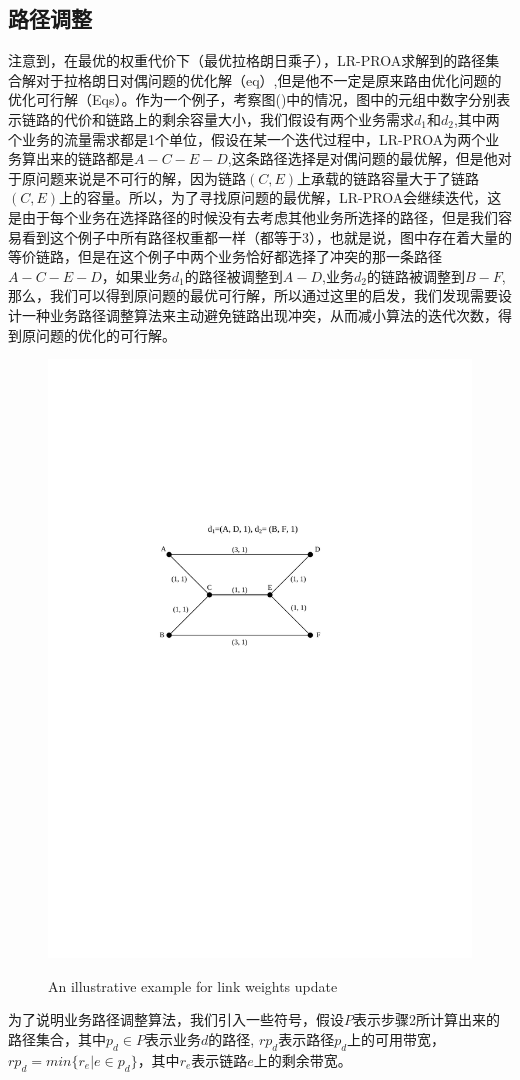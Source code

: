 \subsection{路径调整}
  注意到，在最优的权重代价下（最优拉格朗日乘子），LR-PROA求解到的路径集合解对于拉格朗日对偶问题的优化解（eq）,但是他不一定是原来路由优化问题的优化可行解（Eqs）。作为一个例子，考察图()中的情况，图中的元组中数字分别表示链路的代价和链路上的剩余容量大小，我们假设有两个业务需求$d_1$和$d_2$,其中两个业务的流量需求都是1个单位，假设在某一个迭代过程中，LR-PROA为两个业务算出来的链路都是$A-C-E-D$,这条路径选择是对偶问题的最优解，但是他对于原问题来说是不可行的解，因为链路$(C,E)$上承载的链路容量大于了链路$(C,E)$上的容量。所以，为了寻找原问题的最优解，LR-PROA会继续迭代，这是由于每个业务在选择路径的时候没有去考虑其他业务所选择的路径，但是我们容易看到这个例子中所有路径权重都一样（都等于3），也就是说，图中存在着大量的等价链路，但是在这个例子中两个业务恰好都选择了冲突的那一条路径$A-C-E-D$，如果业务$d_1$的路径被调整到$A-D$,业务$d_2$的链路被调整到$B-F$,那么，我们可以得到原问题的最优可行解，所以通过这里的启发，我们发现需要设计一种业务路径调整算法来主动避免链路出现冲突，从而减小算法的迭代次数，得到原问题的优化的可行解。
\begin{figure}
\setlength{\belowcaptionskip}{-0.1cm}
  \begin{center}
    {\includegraphics[width=0.4 \textwidth]{figures/PathAdj.pdf}}
    \end{center}
  \caption{{\footnotesize{An illustrative example for link weights update}}}
  \label{IterNum}
\end{figure}
  为了说明业务路径调整算法，我们引入一些符号，假设$P$表示步骤2所计算出来的路径集合，其中$p_d\in P$表示业务$d$的路径, $rp_{d}$表示路径$p_d$上的可用带宽，$rp_{d} = min\{r_e | e\in p_d\}$，其中$r_e$表示链路$e$上的剩余带宽。
